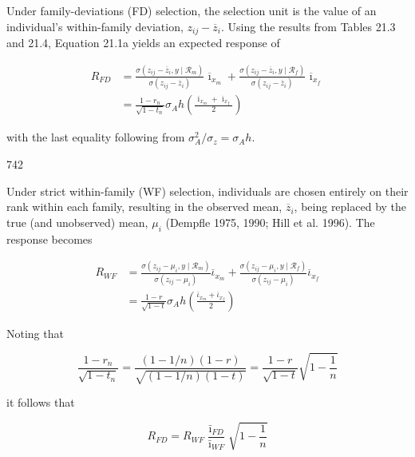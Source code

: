 \documentclass{article}
\begin{document}
Under family-deviations (FD) selection, the selection unit is the value of an individual's within-family deviation,  $ z_{ij} - \overline{z}_i $. Using the results from Tables 21.3 and 21.4, Equation 21.1a yields an expected response of

\begin{equation}
\begin{aligned}R_{FD}&=\frac{\sigma(z_{ij}-\overline{z}_{i},y\mid\mathcal{R}_{m})}{\sigma(z_{ij}-\overline{z}_{i})}\overline{\imath}_{x_{m}}+\frac{\sigma(z_{ij}-\overline{z}_{i},y\mid\mathcal{R}_{f})}{\sigma(z_{ij}-\overline{z}_{i})}\overline{\imath}_{x_{f}}\\&=\frac{1-r_{n}}{\sqrt{1-t_{n}}}\sigma_{A}h\left(\frac{\overline{\imath}_{x_{m}}+\overline{\imath}_{x_{f}}}{2}\right)\end{aligned}
\tag{21.19}
\label{eq:21_19}
\end{equation}

with the last equality following from  $ \sigma_{A}^{2}/\sigma_{z}=\sigma_{A}h $.

742

Under strict within-family (WF) selection, individuals are chosen entirely on their rank within each family, resulting in the observed mean,  $ \overline{z}_{i} $, being replaced by the true (and unobserved) mean,  $ \mu_{i} $ (Dempfle 1975, 1990; Hill et al. 1996). The response becomes

\begin{equation}
\begin{aligned}R_{WF}&=\frac{\sigma\left(z_{ij}-\mu_{i},y\mid\mathcal{R}_{m}\right)}{\sigma\left(z_{ij}-\mu_{i}\right)}\overline{\iota}_{x_{m}}+\frac{\sigma\left(z_{ij}-\mu_{i},y\mid\mathcal{R}_{f}\right)}{\sigma\left(z_{ij}-\mu_{i}\right)}\overline{\iota}_{x_{f}}\\&=\frac{1-r}{\sqrt{1-t}}\sigma_{A}h\left(\frac{\overline{\iota}_{x_{m}}+\overline{\iota}_{x_{f}}}{2}\right)\end{aligned}
\tag{21.20}
\label{eq:21_20}
\end{equation}

Noting that

\begin{equation}
\frac{1-r_{n}}{\sqrt{1-t_{n}}}=\frac{(1-1/n)(1-r)}{\sqrt{(1-1/n)(1-t)}}=\frac{1-r}{\sqrt{1-t}}\sqrt{1-\frac{1}{n}}
\end{equation}

it follows that

\begin{equation}
R_{FD}=R_{WF}\frac{\bar{\imath}_{FD}}{\bar{\imath}_{WF}}\sqrt{1-\frac{1}{n}}
\tag{21.21}
\label{eq:21_21}
\end{equation}
\end{document}
